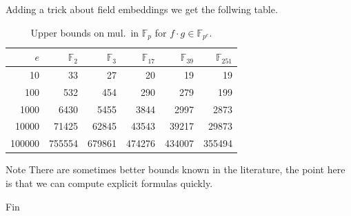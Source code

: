 \documentclass[11pt]{beamer}
\newcommand{\field}[1]{\mathbb{#1}}
\newcommand{\F}{\ensuremath{\field{F}}\xspace}
\begin{document}
\begin{frame}[allowframebreaks]
\framebreak

Adding a trick about field embeddings we get the follwing table.

\begin{table}[ht]
{\centering
\begin{tabular}{|r|r|r|r|r|r|}
\hline
$e$ & $\F_2$ & $\F_3$ & $\F_{17}$ & $\F_{39}$ & $\F_{251}$\\ 
\hline
    10 &     33 &     27 &     20 &     19 &     19\\
   100 &    532 &    454 &    290 &    279 &    199\\
  1000 &   6430 &   5455 &   3844 &   2997 &   2873\\
 10000 &  71425 &  62845 &  43543 &  39217 &  29873\\
100000 & 755554 & 679861 & 474276 & 434007 & 355494\\
\hline
\end{tabular}}
\caption{Upper bounds on mul.\ in $\F_p$ for $f\cdot g \in \F_{p^e}$.}
\label{tab:matpoly}
\end{table}

\begin{block}{Note}
There are sometimes better bounds known in the literature, the point here is that we can compute explicit formulas quickly. 
\end{block}


\end{frame}


\begin{frame}{}
\begin{center}
Fin
\end{center}

\end{frame}

\begin{frame}[allowframebreaks]


\end{frame}
\end{document}
